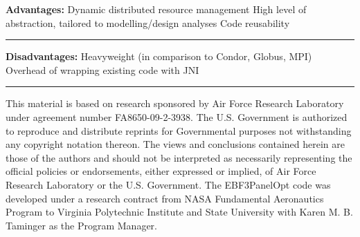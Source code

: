 \bigskip \bigskip
{\bf Advantages:}
\medskip
\bull Dynamic distributed resource management
\medskip
\bull High level of abstraction, tailored to modelling/design analyses
\medskip
\bull Code reusability
\vfil\hrule\bigskip\bigskip
{\bf Disadvantages:}
\medskip
\bull Heavyweight (in comparison to Condor, Globus, MPI)
\medskip
\bull Overhead of wrapping existing code with JNI
\vfil\eject

\vfil\hrule \bigskip \bigskip
{}
\bigskip \bigskip
This material is based on research sponsored by Air Force Research Laboratory
under agreement number FA8650-09-2-3938. The U.S. Government is authorized to
reproduce and distribute reprints for Governmental purposes not withstanding
any copyright notation thereon.
The views and conclusions contained herein are those of the authors and should
not be interpreted as necessarily representing the official policies or
endorsements, either expressed or implied, of Air Force Research Laboratory or
the U.S. Government. 
The EBF3PanelOpt code was developed under a research contract from NASA
Fundamental Aeronautics Program to Virginia Polytechnic Institute and State
University with Karen M. B. Taminger as the Program Manager.
\vfil\eject

\bye
